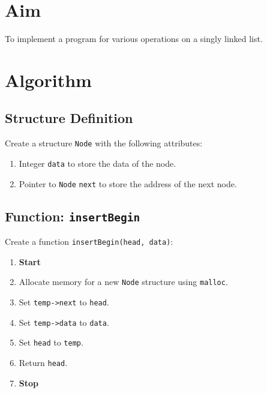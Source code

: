 
\section{Aim}
To implement a program for various operations on a singly linked list.

\section{Algorithm}
 {\selectfont

  \subsection{Structure Definition}
  Create a structure \texttt{Node} with the following attributes:
  \begin{enumerate}[label=\arabic*:,left=0pt]
    \item Integer \texttt{data} to store the data of the node.
    \item Pointer to \texttt{Node} \texttt{next} to store the address of the next node.
  \end{enumerate}

  \subsection{Function: \texttt{insertBegin}}
  Create a function \texttt{insertBegin(head, data)}:
  \begin{enumerate}[label=\arabic*:,left=0pt]
    \item \textbf{Start}
    \item Allocate memory for a new \texttt{Node} structure using \texttt{malloc}.
    \item Set \texttt{temp->next} to \texttt{head}.
    \item Set \texttt{temp->data} to \texttt{data}.
    \item Set \texttt{head} to \texttt{temp}.
    \item Return \texttt{head}.
    \item \textbf{Stop}
  \end{enumerate}

}
